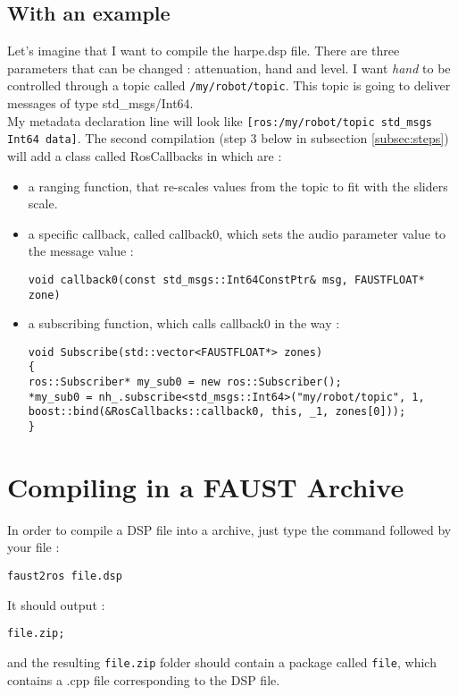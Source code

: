 \subsection{With an example}
Let's imagine that I want to compile the harpe.dsp file. There are three parameters that can be 
changed : attenuation, hand and level. I want \textit{hand} to be controlled through a topic 
called \texttt{/my/robot/topic}. This topic is going to deliver messages of type 
std\_msgs/Int64. \\
My metadata declaration line will look like 
\lstinline'[ros:/my/robot/topic std_msgs Int64 data]'.
The second compilation (step 3 below in subsection \ref{subsec:steps}) will add a class called RosCallbacks in which are :
\begin{itemize}
\item a ranging function, that re-scales values from the topic to fit with the \faust sliders scale.
\item a specific callback, called callback0, which sets the audio parameter value to the message value : \begin{lstlisting}
void callback0(const std_msgs::Int64ConstPtr& msg, FAUSTFLOAT* zone)
\end{lstlisting}
\item a subscribing function, which calls callback0 in the \ros way : 
\begin{lstlisting}
void Subscribe(std::vector<FAUSTFLOAT*> zones)
{
ros::Subscriber* my_sub0 = new ros::Subscriber();
*my_sub0 = nh_.subscribe<std_msgs::Int64>("my/robot/topic", 1, boost::bind(&RosCallbacks::callback0, this, _1, zones[0]));
}
\end{lstlisting}
\end{itemize}

\newpage
\section{Compiling in a FAUST Archive}
In order to compile a DSP file into a \faust archive, just type the command followed by your file : 
\begin{lstlisting}
faust2ros file.dsp
\end{lstlisting}
It should output :
\begin{lstlisting}
file.zip;
\end{lstlisting}
and the resulting  \lstinline'file.zip' folder should contain a package called \lstinline'file', which contains a .cpp file corresponding to the DSP file.\\

